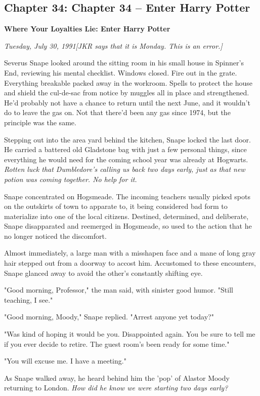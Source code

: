 \documentclass[a4paper,11pt]{article}
\begin{document}
\subsection{Chapter 34: Chapter 34 – Enter Harry Potter}

\textbf{Where Your Loyalties Lie: Enter Harry Potter}

\emph{Tuesday, July 30, 1991}\emph{[JKR says that it is Monday. This is an error.]}

Severus Snape looked around the sitting room in his small house in Spinner's End, reviewing his mental checklist. Windows closed. Fire out in the grate. Everything breakable packed away in the workroom. Spells to protect the house and shield the cul-de-sac from notice by muggles all in place and strengthened. He'd probably not have a chance to return until the next June, and it wouldn't do to leave the gas on. Not that there'd been any gas since 1974, but the principle was the same.

Stepping out into the area yard behind the kitchen, Snape locked the last door. He carried a battered old Gladstone bag with just a few personal things, since everything he would need for the coming school year was already at Hogwarts. \emph{Rotten luck that Dumbledore's calling us back two days early, just as that new potion was coming together. No help for it.}

Snape concentrated on Hogsmeade. The incoming teachers usually picked spots on the outskirts of town to apparate to, it being considered bad form to materialize into one of the local citizens. Destined, determined, and deliberate, Snape disapparated and reemerged in Hogsmeade, so used to the action that he no longer noticed the discomfort.

Almost immediately, a large man with a misshapen face and a mane of long gray hair stepped out from a doorway to accost him. Accustomed to these encounters, Snape glanced away to avoid the other's constantly shifting eye.

"Good morning, Professor," the man said, with sinister good humor. "Still teaching, I see."

"Good morning, Moody," Snape replied. "Arrest anyone yet today?"

"Was kind of hoping it would be you. Disappointed again. You be sure to tell me if you ever decide to retire. The guest room's been ready for some time."

"You will excuse me. I have a meeting."

As Snape walked away, he heard behind him the 'pop' of Alastor Moody returning to London. \emph{How did he know we were starting two days early?}
\end{document}
